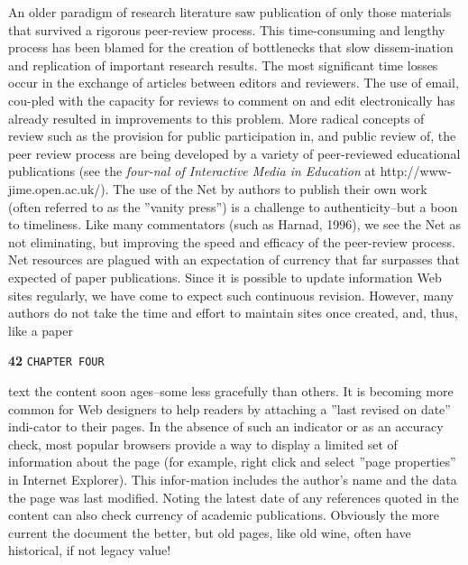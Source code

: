 \documentclass{book}
\begin{document}
\small{
An older paradigm of research literature saw publication of only those materials that survived a rigorous peer-review process. This time-consuming and lengthy process has been blamed for the creation of bottlenecks that slow dissem-ination and replication of important research results. The most significant time losses occur in the exchange of articles between editors and reviewers. The use of email, cou-pled with the capacity for reviews to comment on and edit electronically has already resulted in improvements to this problem. More radical concepts of review such as the provision for public participation in, and public review of, the peer review process are being developed by a variety of peer-reviewed educational publications (see the \emph{four-nal of Interactive Media in Education } at http://www-jime.open.ac.uk/). The use of the Net by authors to publish their own work (often referred to as the ''vanity press'') is a challenge to authenticity--but a boon to timeliness. Like many commentators (such as Harnad, 1996), we see the Net as not eliminating, but improving the speed and efficacy of the peer-review process.\\
\hspace*{0.5cm} Net resources are plagued with an expectation of currency that far surpasses that expected of paper publications. Since it is possible to update information Web sites regularly, we have come to expect such continuous revision. However, many authors do not take the time and effort to maintain sites once created, and, thus, like a paper\\ }

\newpage
\begin{flushleft}
\textbf{42} \hspace*{1cm} \texttt{CHAPTER FOUR}
\end{flushleft}

\vspace*{1cm}
text the content soon ages--some less gracefully than others. It is becoming more common for Web designers to help readers by attaching a ''last revised on date'' indi-cator to their pages. In the absence of such an indicator or as an accuracy check, most popular browsers provide a way to display a limited set of information about the page (for example, right click and select ''page properties'' in Internet Explorer). This infor-mation includes the author's name and the data the page was last modified. Noting the latest date of any references quoted in the content can also check currency of academic publications. Obviously the more current the document the better, but old pages, like old wine, often have historical, if not legacy value!\\
\end{document}
